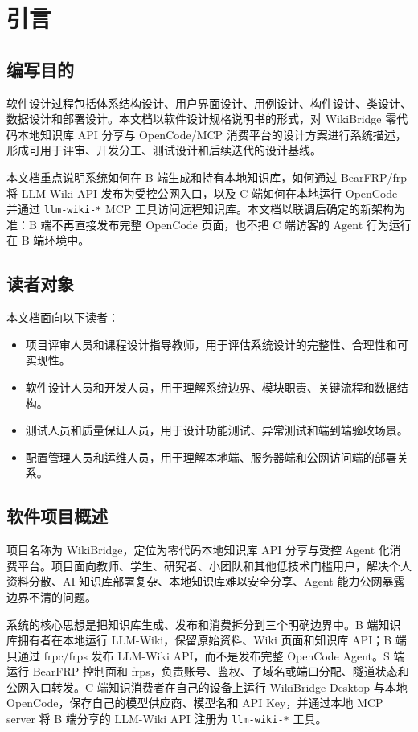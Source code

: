 \documentclass[UTF8,a4paper,12pt,fontset=fandol]{ctexart}
\newcommand{\code}[1]{\texttt{\footnotesize #1}}
\begin{document}
\newpage
\tableofcontents
\newpage
{}

\section{引言}

\subsection{编写目的}
软件设计过程包括体系结构设计、用户界面设计、用例设计、构件设计、类设计、数据设计和部署设计。本文档以软件设计规格说明书的形式，对 WikiBridge 零代码本地知识库 API 分享与 OpenCode/MCP 消费平台的设计方案进行系统描述，形成可用于评审、开发分工、测试设计和后续迭代的设计基线。

本文档重点说明系统如何在 B 端生成和持有本地知识库，如何通过 BearFRP/frp 将 LLM-Wiki API 发布为受控公网入口，以及 C 端如何在本地运行 OpenCode 并通过 \code{llm-wiki-*} MCP 工具访问远程知识库。本文档以联调后确定的新架构为准：B 端不再直接发布完整 OpenCode 页面，也不把 C 端访客的 Agent 行为运行在 B 端环境中。

\subsection{读者对象}
本文档面向以下读者：
\begin{itemize}
  \item 项目评审人员和课程设计指导教师，用于评估系统设计的完整性、合理性和可实现性。
  \item 软件设计人员和开发人员，用于理解系统边界、模块职责、关键流程和数据结构。
  \item 测试人员和质量保证人员，用于设计功能测试、异常测试和端到端验收场景。
  \item 配置管理人员和运维人员，用于理解本地端、服务器端和公网访问端的部署关系。
\end{itemize}

\subsection{软件项目概述}
项目名称为 WikiBridge，定位为零代码本地知识库 API 分享与受控 Agent 化消费平台。项目面向教师、学生、研究者、小团队和其他低技术门槛用户，解决个人资料分散、AI 知识库部署复杂、本地知识库难以安全分享、Agent 能力公网暴露边界不清的问题。

系统的核心思想是把知识库生成、发布和消费拆分到三个明确边界中。B 端知识库拥有者在本地运行 LLM-Wiki，保留原始资料、Wiki 页面和知识库 API；B 端只通过 frpc/frps 发布 LLM-Wiki API，而不是发布完整 OpenCode Agent。S 端运行 BearFRP 控制面和 frps，负责账号、鉴权、子域名或端口分配、隧道状态和公网入口转发。C 端知识消费者在自己的设备上运行 WikiBridge Desktop 与本地 OpenCode，保存自己的模型供应商、模型名和 API Key，并通过本地 MCP server 将 B 端分享的 LLM-Wiki API 注册为 \code{llm-wiki-*} 工具。
\end{document}
